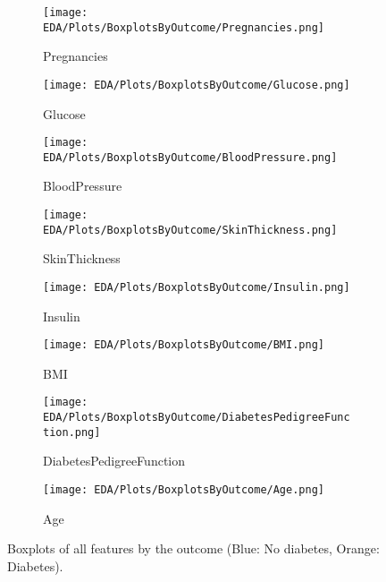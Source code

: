 \begin{figure}[H]
    \centering
    \begin{subfigure}[b]{0.45\textwidth}
        \texttt{[image: EDA/Plots/BoxplotsByOutcome/Pregnancies.png]}
        \caption{Pregnancies}
        \label{fig:PregnanciesByOutcome}
    \end{subfigure}
    \hfill
    \begin{subfigure}[b]{0.45\textwidth}
        \texttt{[image: EDA/Plots/BoxplotsByOutcome/Glucose.png]}
        \caption{Glucose}
        \label{fig:GlucoseByOutcome}
    \end{subfigure}
    
    \vspace{1em}
    
    \begin{subfigure}[b]{0.45\textwidth}
        \texttt{[image: EDA/Plots/BoxplotsByOutcome/BloodPressure.png]}
        \caption{BloodPressure}
        \label{fig:BloodPressureByOutcome}
    \end{subfigure}
    \hfill
    \begin{subfigure}[b]{0.45\textwidth}
        \texttt{[image: EDA/Plots/BoxplotsByOutcome/SkinThickness.png]}
        \caption{SkinThickness}
        \label{fig:SkinThicknessByOutcome}
    \end{subfigure}
    
    \vspace{1em}
    
    \begin{subfigure}[b]{0.45\textwidth}
        \texttt{[image: EDA/Plots/BoxplotsByOutcome/Insulin.png]}
        \caption{Insulin}
        \label{fig:InsulinByOutcome}
    \end{subfigure}
    \hfill
    \begin{subfigure}[b]{0.45\textwidth}
        \texttt{[image: EDA/Plots/BoxplotsByOutcome/BMI.png]}
        \caption{BMI}
        \label{fig:BMIByOutcome}
    \end{subfigure}
    
    \vspace{1em}
    
    \begin{subfigure}[b]{0.45\textwidth}
        \texttt{[image: EDA/Plots/BoxplotsByOutcome/DiabetesPedigreeFunction.png]}
        \caption{DiabetesPedigreeFunction}
        \label{fig:PedigreeByOutcome}
    \end{subfigure}
    \hfill
    \begin{subfigure}[b]{0.45\textwidth}
        \texttt{[image: EDA/Plots/BoxplotsByOutcome/Age.png]}
        \caption{Age}
        \label{fig:AgeByOutcome}
    \end{subfigure}
    
    \caption{Boxplots of all features by the outcome (Blue: No diabetes, Orange: Diabetes).}
    \label{fig:AllBoxplotsByOutcome}
\end{figure}

